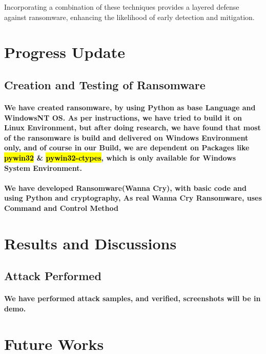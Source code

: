 \documentclass[12pt,twocolumn]{article}
\begin{document}
Incorporating a combination of these techniques provides a layered defense against ransomware, enhancing the likelihood of early detection and mitigation.


%
\section{Progress Update}

\subsection{Creation and Testing of Ransomware}

\paragraph{We have created ransomware, by using Python as base Language and WindowsNT OS. As per instructions, we have tried to build it on Linux Environment, but after doing research, we have found that most of the ransomware is build and delivered on Windows Environment only, and of course in our Build, we are dependent on Packages like \hl{pywin32} \& \hl{pywin32-ctypes}, which is only available for Windows System Environment.}

\paragraph{We have developed Ransomware(Wanna Cry), with basic code and using Python and cryptography, As real Wanna Cry Ransomware, uses Command and Control Method }


\section{Results and Discussions}

\subsection{Attack Performed}
\paragraph{We have performed attack samples, and verified, screenshots will be in demo.}




\section{Future Works}
\end{document}
